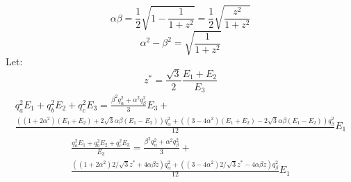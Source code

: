 \documentclass[final]{article}
\begin{document}
\[\alpha\beta=\frac{1}{2}\sqrt{1-\frac{1}{1+z^2}}=\frac{1}{2}\sqrt{\frac{z^2}{1+z^2}}\]
\[\alpha^2-\beta^2=\sqrt{\frac{1}{1+z^2}}\]
Let:
\[z^*=\frac{\sqrt{3}}{2} \frac{E_1+E_2}{E_3}\]
\begin{multline*}
q_a^2 E_1+ q_b^2 E_2+q_c^2 E_3=\frac{\beta^2 q_\alpha^2+\alpha^2 q_\beta^2}{3}E_3+\\
\frac{((1+2\alpha^2)(E_1+E_2)+2\sqrt{3}\alpha \beta(E_1-E_2))q_\alpha^2+((3-4\alpha^2)(E_1+E_2)-2\sqrt{3}\alpha \beta(E_1-E_2))q_\beta^2}{12} E_1
\end{multline*}
\begin{multline*}
\frac{q_a^2 E_1+ q_b^2 E_2+q_c^2 E_3}{E_3}=\frac{\beta^2 q_\alpha^2+\alpha^2 q_\beta^2}{3}+\\
\frac{((1+2\alpha^2)2/\sqrt{3}z^*+4\alpha \beta z)q_\alpha^2+((3-4\alpha^2)2/\sqrt{3}z^*-4\alpha \beta z)q_\beta^2}{12} E_1
\end{multline*}
\end{document}
